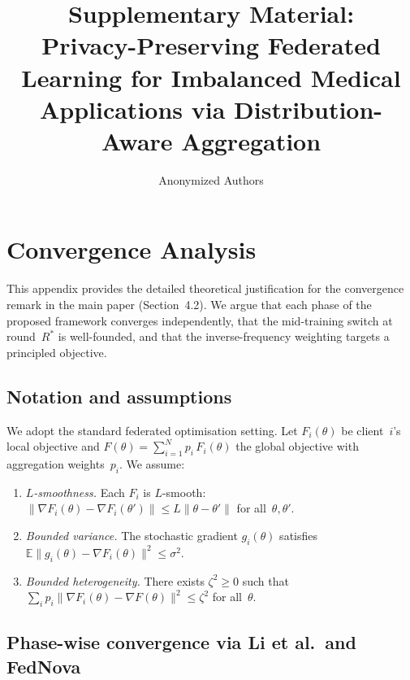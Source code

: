 \documentclass[runningheads]{llncs}
\begin{document}
\title{Supplementary Material:\\Privacy-Preserving Federated Learning for Imbalanced Medical Applications via Distribution-Aware Aggregation}

\author{Anonymized Authors}

\maketitle

\appendix

\section{Convergence Analysis}\label{app:convergence}

This appendix provides the detailed theoretical justification for the convergence remark in the main paper (Section~4.2).
We argue that each phase of the proposed framework converges independently, that the mid-training switch at round~$R^*$ is well-founded, and that the inverse-frequency weighting targets a principled objective.

\subsection{Notation and assumptions}

We adopt the standard federated optimisation setting.
Let $F_i(\theta)$ be client~$i$'s local objective and
$F(\theta)=\sum_{i=1}^N p_i\,F_i(\theta)$
the global objective with aggregation weights~$p_i$.
We assume:
\begin{enumerate}
\item[\textbf{A1.}] \emph{$L$-smoothness.} Each $F_i$ is $L$-smooth: $\|\nabla F_i(\theta)-\nabla F_i(\theta')\|\le L\|\theta-\theta'\|$ for all~$\theta,\theta'$.
\item[\textbf{A2.}] \emph{Bounded variance.} The stochastic gradient $g_i(\theta)$ satisfies $\mathbb{E}\|g_i(\theta)-\nabla F_i(\theta)\|^2\le\sigma^2$.
\item[\textbf{A3.}] \emph{Bounded heterogeneity.} There exists $\zeta^2\ge0$ such that $\sum_i p_i\|\nabla F_i(\theta)-\nabla F(\theta)\|^2\le\zeta^2$ for all~$\theta$.
\end{enumerate}

\subsection{Phase-wise convergence via Li et al.\ and FedNova}\label{app:phase_convergence}
\end{document}
